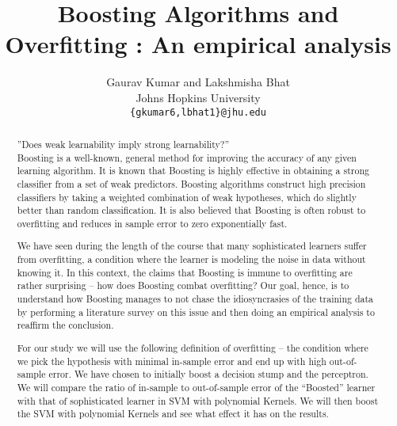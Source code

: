 \documentclass[letterpaper,11pt]{article}
\title{Boosting Algorithms and Overfitting : An empirical analysis}
\date{}
\author{Gaurav Kumar and Lakshmisha Bhat\\
  Johns Hopkins University\\
  \texttt{\{gkumar6,lbhat1\}@jhu.edu}}
\begin{document}
\large
\maketitle
\thispagestyle{headings}

\vspace{-.3in}

\begin{abstract}
\noindent
''Does weak learnability imply strong learnability?''\\
Boosting is a well-known, general method for improving the accuracy of any given learning algorithm. It is known that Boosting is highly effective in obtaining a strong classifier from a set of weak predictors. Boosting algorithms construct high precision classifiers by taking a weighted combination of weak hypotheses, which do slightly better than random classification. It is also believed that Boosting is often robust to overfitting and reduces in sample error to zero exponentially fast.
 
We have seen during the length of the course that many sophisticated learners suffer from overfitting, a condition where the learner is modeling the noise in data without knowing it. In this context, the claims that Boosting is immune to overfitting are rather surprising – how does Boosting combat overfitting? Our goal, hence, is to understand how Boosting manages to not chase the idiosyncrasies of the training data by performing a literature survey on this issue and then doing an empirical analysis to reaffirm the conclusion.
 
For our study we will use the following definition of overfitting – the condition where we pick the hypothesis with minimal in-sample error and end up with high out-of-sample error. We have chosen to initially boost a decision stump and the perceptron. We will compare the ratio of in-sample to out-of-sample error of the “Boosted” learner with that of sophisticated learner in SVM with polynomial Kernels. We will then boost the SVM with polynomial Kernels and see what effect it has on the results.

\end{abstract}
\end{document}
